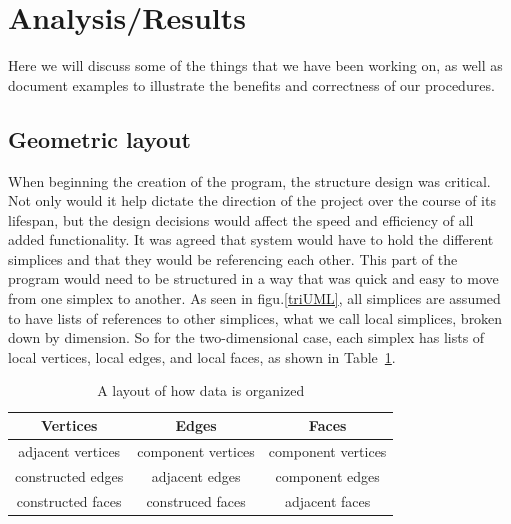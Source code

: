 \documentclass[12pt]{article}
\begin{document}
\newpage
\section{Analysis/Results}
\maketitle
  Here we will discuss some of the things that we have been working on, as well as document examples to illustrate the benefits and correctness of our procedures. 
  
  \subsection{Geometric layout}
  \maketitle
  
When beginning the creation of the program, the structure design was critical. Not only would it help dictate the direction of the project over the course of its lifespan, but the design decisions would affect the speed and efficiency of all added functionality. It was agreed that system would have to hold the different simplices and that they would be referencing each other. This part of the program would need to be structured in a way that was quick and easy to move from one simplex to another. As seen in figu.\ref{triUML}, all simplices are assumed to have lists of references to other simplices, what we call local simplices, broken down by dimension. So for the two-dimensional case, each simplex has lists of local vertices, local edges, and local faces, as shown in Table~\ref{geomat}.\newline

  \begin{table}[b]
  \begin{center}
  \begin{tabular}{|c|c|c|}
  \hline
  Vertices & Edges & Faces\\
  \hline
  adjacent vertices & component vertices & component vertices\\
  constructed edges & adjacent edges & component edges\\
  constructed faces & construced faces & adjacent faces\\
  \hline
  \end{tabular}
  \end{center}
  \caption{A layout of how data is organized}
  \label{geomat}
  \end{table}
  
\end{document}
